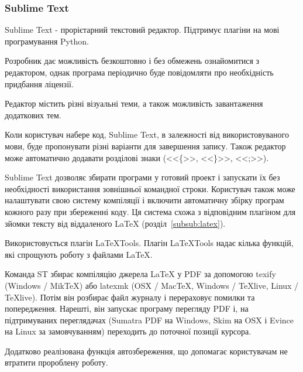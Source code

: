 \subsubsection{Sublime Text}

Sublime Text - прорієтарний текстовий редактор. Підтримує плагіни на мові програмування Python.

Розробник дає можливість безкоштовно і без обмежень ознайомитися з редактором, однак програма періодично буде повідомляти про необхідність придбання ліцензії.

Редактор містить різні візуальні теми, а також можливість завантаження додаткових тем.

Коли користувач набере код, Sublime Text, в залежності від використовуваного мови, буде пропонувати різні варіанти для завершення запису. Також редактор може автоматично додавати розділові знаки (<<\{>>, <<\}>>, <<;>>).

Sublime Text дозволяє збирати програми у готовий проект і запускати їх без необхідності використання зовнішньої командної строки. Користувач також може налаштувати свою систему компіляції і включити автоматичну збірку програм кожного разу при збереженні коду. Ця система схожа з відповідним плагіном для зйомки тексту від віддаленого LaTeX (розділ~\ref{subsub:latex}).

Використовується плагін LaTeXTools. Плагін LaTeXTools надає кілька функцій, які спрощують роботу з файлами LaTeX.

Команда ST збирає компіляцію джерела LaTeX у PDF за допомогою texify (Windows / MikTeX) або latexmk (OSX / MacTeX, Windows / TeXlive, Linux / TeXlive). Потім він розбирає файл журналу і перераховує помилки та попередження. Нарешті, він запускає програму перегляду PDF і, на підтримуваних переглядачах (Sumatra PDF на Windows, Skim на OSX і Evince на Linux за замовчуванням) переходить до поточної позиції курсора.

Додатково реалізована функція автозбереження, що допомагає користувачам не втратити пророблену роботу.
